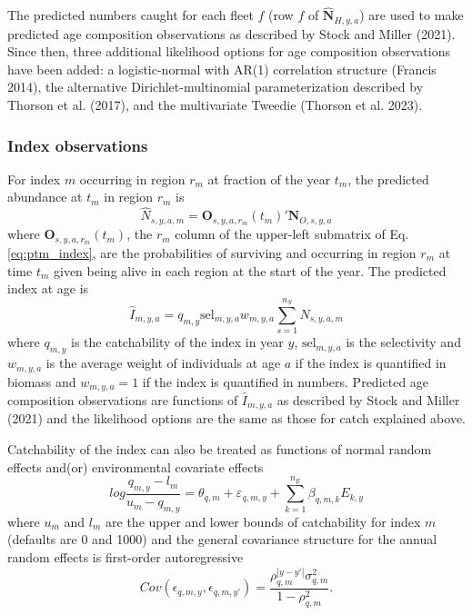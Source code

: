 \documentclass[
]{article}
\begin{document}
The predicted numbers caught for each fleet \(f\) (row \(f\) of
\(\widehat{\mathbf{N}}_{H,y,a}\)) are used to make predicted age
composition observations as described by Stock and Miller (2021). Since
then, three additional likelihood options for age composition
observations have been added: a logistic-normal with AR(1) correlation
structure (Francis 2014), the alternative Dirichlet-multinomial
parameterization described by Thorson et al. (2017), and the
multivariate Tweedie (Thorson et al. 2023).

\hypertarget{index-observations}{%
\subsubsection*{Index observations}\label{index-observations}}

For index \(m\) occurring in region \(r_m\) at fraction of the year
\(t_m\), the predicted abundance at \(t_m\) in region \(r_m\) is
\[\widehat{N}_{s,y,a,m} = \mathbf{O}_{s,y,a,r_m}(t_m)' \mathbf{N}_{O,s,y,a}\]
where \(\mathbf{O}_{s,y,a,r_m}(t_m)\), the \(r_m\) column of the
upper-left submatrix of Eq. \ref{eq:ptm_index}, are the probabilities of
surviving and occurring in region \(r_m\) at time \(t_m\) given being
alive in each region at the start of the year. The predicted index at
age is
\[\widehat{I}_{m,y,a} = q_{m,y} \text{sel}_{m,y,a}w_{m,y,a}\sum^{n_S}_{s = 1}\widehat{N}_{s,y,a,m}\]
where \(q_{m,y}\) is the catchability of the index in year \(y\),
\(\text{sel}_{m,y,a}\) is the selectivity and \(w_{m,y,a}\) is the
average weight of individuals at age \(a\) if the index is quantified in
biomass and \(w_{m,y,a} = 1\) if the index is quantified in numbers.
Predicted age composition observations are functions of
\(\widehat{I}_{m,y,a}\) as described by Stock and Miller (2021) and the
likelihood options are the same as those for catch explained above.

Catchability of the index can also be treated as functions of normal
random effects and(or) environmental covariate effects
\[log \frac{q_{m,y}-l_m}{u_m-q_{m,y}} = \theta_{q,m} + \varepsilon_{q,m,y}  + \sum^{n_E}_{k=1} \beta_{q,m,k} E_{k,y}\]
where \(u_{m}\) and \(l_{m}\) are the upper and lower bounds of
catchability for index \(m\) (defaults are 0 and 1000) and the general
covariance structure for the annual random effects is first-order
autoregressive
\[Cov\left(\epsilon_{q,m,y},\epsilon_{q,m,y'}\right) =   \frac{\rho_{q,m}^{|y-y'|}\sigma^2_{q,m}}{1 - \rho_{q,m}^2}.\]
\end{document}
